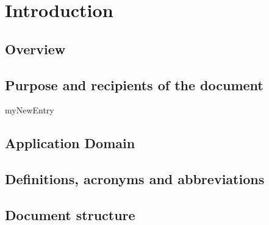 
\chapter{Introduction}
\label{chap:introduction}

\section{Overview}

\section{Purpose and recipients of the document}
\gls{myNewEntry}
 
\section{Application Domain}

 
\section{Definitions, acronyms and abbreviations}


\section{Document structure} 
